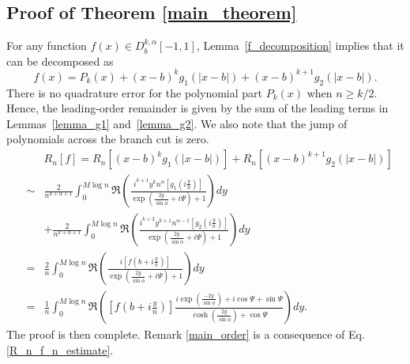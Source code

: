 \documentclass[11pt]{article}
\begin{document}
\subsection{Proof of Theorem \ref{main_theorem}} For any function $f(x) \in D_b^{k,\alpha}[-1,1]$, Lemma~\ref{f_decomposition} implies that it can be decomposed as
\begin{equation}
    f(x) = P_k(x) + (x-b)^k g_1(|x-b|) + (x-b)^{k+1} g_2(|x-b|).
\end{equation}
There is no quadrature error for the polynomial part $P_k(x)$ when $n \geq k/2$. 
Hence, the leading-order remainder is given by the sum of the leading terms in Lemmas~\ref{lemma_g1} and~\ref{lemma_g2}. 
We also note that the jump of polynomials across the branch cut is zero.
\begin{eqnarray}
    &&R_n[f] = R_n[(x-b)^k g_1(|x-b|)] + R_n[(x-b)^{k+1} g_2(|x-b|)] \\
    &\sim& \frac{2}{ n^{k+\alpha+1}}\int_{0}^{M\log n}  \Re\left(\frac{ i^{k+1}y^{k} n^{\alpha} \left[ g_1(i\frac{y}{n})\right] }{\exp\left(\frac{2y}{\sin\phi}+i\Psi\right) + 1}\right) dy  \nonumber\\
    &&+\frac{2}{ n^{k+\alpha+1}}\int_{0}^{M\log n}  \Re\left(\frac{ i^{k+2}y^{k+1} n^{\alpha-1} \left[ g_2(i\frac{y}{n})\right] }{\exp\left(\frac{2y}{\sin\phi}+i\Psi\right) + 1}\right) dy  \\
    &=&\frac{2}{n}\int_{0}^{M\log n}  \Re \left(\frac{  i\left[ f(b+i\frac{y}{n})\right] }{\exp\left(\frac{2y}{\sin\phi}+i\Psi\right) + 1} \right) dy\\
    &=&\frac{1}{n} \int_{0}^{M\log n} \Re\left( \left[ f(b+i\frac{y}{n})\right] \frac{  i\exp\left(\frac{-2y}{\sin\phi}\right) + i\cos \Psi + \sin \Psi  }{\cosh\left(\frac{2y}{\sin\phi}\right) + \cos \Psi} \right)dy.
\end{eqnarray}
The proof is then complete. Remark \ref{main_order} is a consequence of Eq. \eqref{R_n_f_n_estimate}.
\end{document}
